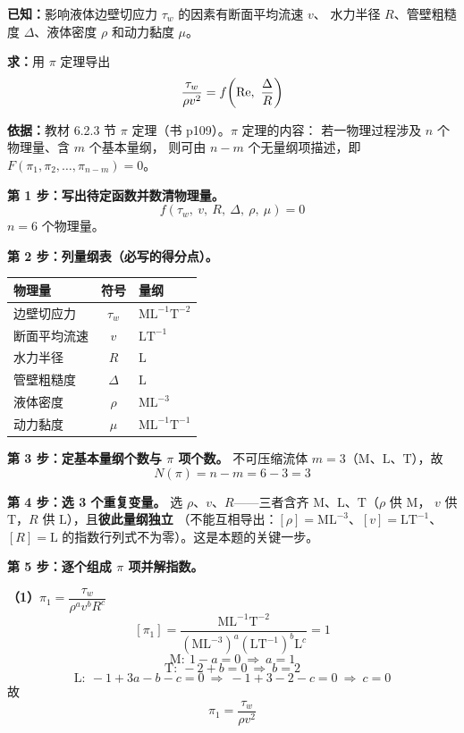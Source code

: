\begin{jie}
\textbf{已知：}影响液体边壁切应力 $\tau_w$ 的因素有断面平均流速 $v$、
水力半径 $R$、管壁粗糙度 $\Delta$、液体密度 $\rho$ 和动力黏度 $\mu$。

\textbf{求：}用 $\pi$ 定理导出
\[ \frac{\tau_w}{\rho v^{2}}=f\!\left(\mathrm{Re},\ \frac{\Delta}{R}\right) \]

\textbf{依据：}教材 6.2.3 节 $\pi$ 定理（书 p109）。$\pi$ 定理的内容：
若一物理过程涉及 $n$ 个物理量、含 $m$ 个基本量纲，
则可由 $n-m$ 个无量纲项描述，即 $F(\pi_1,\pi_2,\dots,\pi_{n-m})=0$。

\textbf{第 1 步：写出待定函数并数清物理量。}
\[ f(\tau_w,\ v,\ R,\ \Delta,\ \rho,\ \mu)=0 \]
$n=6$ 个物理量。

\textbf{第 2 步：列量纲表（必写的得分点）。}

\begin{center}
\begin{tabularx}{\textwidth}{@{}lcX@{}}
\toprule
物理量 & 符号 & 量纲 \\
\midrule
边壁切应力 & $\tau_w$ & $\mathrm{ML^{-1}T^{-2}}$ \\
断面平均流速 & $v$ & $\mathrm{LT^{-1}}$ \\
水力半径 & $R$ & $\mathrm{L}$ \\
管壁粗糙度 & $\Delta$ & $\mathrm{L}$ \\
液体密度 & $\rho$ & $\mathrm{ML^{-3}}$ \\
动力黏度 & $\mu$ & $\mathrm{ML^{-1}T^{-1}}$ \\
\bottomrule
\end{tabularx}
\end{center}

\textbf{第 3 步：定基本量纲个数与 $\pi$ 项个数。}
不可压缩流体 $m=3$（$\mathrm{M}$、$\mathrm{L}$、$\mathrm{T}$），故
\[ N(\pi)=n-m=6-3=3 \]

\textbf{第 4 步：选 3 个重复变量。}
选 $\rho$、$v$、$R$——三者含齐 $\mathrm{M}$、$\mathrm{L}$、$\mathrm{T}$（$\rho$ 供 $\mathrm{M}$，
$v$ 供 $\mathrm{T}$，$R$ 供 $\mathrm{L}$），且\textbf{彼此量纲独立}
（不能互相导出：$[\rho]=\mathrm{ML^{-3}}$、$[v]=\mathrm{LT^{-1}}$、$[R]=\mathrm{L}$
的指数行列式不为零）。这是本题的关键一步。

\textbf{第 5 步：逐个组成 $\pi$ 项并解指数。}

\textbf{（1）$\pi_1=\dfrac{\tau_w}{\rho^{a}v^{b}R^{c}}$}
\[ [\pi_1]=\frac{\mathrm{ML^{-1}T^{-2}}}
   {\left(\mathrm{ML^{-3}}\right)^{a}\left(\mathrm{LT^{-1}}\right)^{b}\mathrm{L}^{c}}=1 \]
\[ \mathrm{M}:\ 1-a=0\ \Longrightarrow\ a=1 \]
\[ \mathrm{T}:\ -2+b=0\ \Longrightarrow\ b=2 \]
\[ \mathrm{L}:\ -1+3a-b-c=0\ \Longrightarrow\ -1+3-2-c=0
   \ \Longrightarrow\ c=0 \]
故
\[ \pi_1=\frac{\tau_w}{\rho v^{2}} \]


\end{jie}
